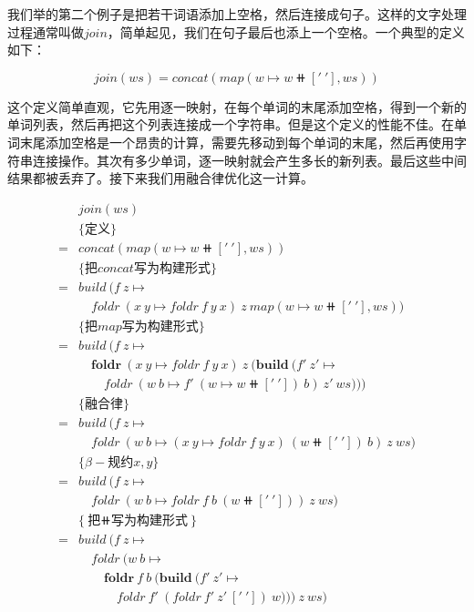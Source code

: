 \documentclass{article}
\begin{document}
\begin{example}
我们举的第二个例子是把若干词语添加上空格，然后连接成句子。这样的文字处理过程通常叫做$join$，简单起见，我们在句子最后也添上一个空格。一个典型的定义如下：

\[
join(ws) = concat(map(w \mapsto w \doubleplus ['\ '], ws))
\]

这个定义简单直观，它先用逐一映射，在每个单词的末尾添加空格，得到一个新的单词列表，然后再把这个列表连接成一个字符串。但是这个定义的性能不佳。在单词末尾添加空格是一个昂贵的计算，需要先移动到每个单词的末尾，然后再使用字符串连接操作。其次有多少单词，逐一映射就会产生多长的新列表。最后这些中间结果都被丢弃了。接下来我们用融合律优化这一计算。

\[ \begin{array}{rl}
  & join(ws) \\
  & \{\text{定义} \} \\
= & concat(map(w \mapsto w \doubleplus ['\ '], ws)) \\

  & \{\text{把$concat$写为构建形式}\} \\
= & build\ (f\ z \mapsto \\
  & \quad foldr\ (x\ y \mapsto foldr\ f\ y\ x)\ z\ map(w \mapsto w \doubleplus ['\ '], ws)) \\

  & \{\text{把$map$写为构建形式}\} \\
= & build\ (f\ z \mapsto \\
  & \quad \pmb{foldr}\ (x\ y \mapsto foldr\ f\ y\ x)\ z\ (\pmb{build}\ (f'\ z' \mapsto \\
  & \quad \quad foldr\ (w\ b \mapsto f'\ (w \mapsto w \doubleplus ['\ '])\ b)\ z'\ ws))) \\

  & \{\text{融合律}\} \\
= & build\ (f\ z \mapsto \\
  & \quad foldr\ (w\ b \mapsto (x\ y \mapsto foldr\ f\ y\ x)\ (w \doubleplus ['\ '])\ b)\ z\ ws) \\

  & \{\beta-\text{规约}x, y\} \\
= & build\ (f\ z \mapsto \\
  & \quad foldr\ (w\ b \mapsto foldr\ f\ b\ (w \doubleplus ['\ ']))\ z\ ws) \\

  & \{\text{把$\doubleplus$写为构建形式}\} \\
= & build\ (f\ z \mapsto \\
  & \quad foldr\ (w\ b \mapsto \\
  & \quad \quad \pmb{foldr}\ f\ b\ (\pmb{build}\ (f'\ z' \mapsto \\
  & \quad \quad \quad foldr\ f'\ (foldr\ f'\ z'\ ['\ '])\ w)))\ z\ ws) \\


\end{array}\]
\end{example}
\end{document}
